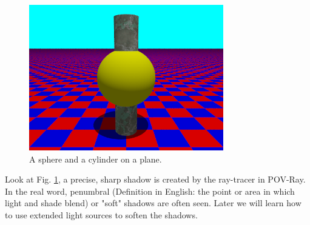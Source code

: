 \documentclass[fleqn,10pt]{wlscirep}
\newcommand*{\PV}{POV-Ray}
\newcommand*{\DF}{Definition in English}
\begin{document}
\begin{figure}[htbp]
\centering
\includegraphics[width=20pc,clip]{FIG6}
\caption{A sphere and a cylinder on a plane.}
\label{fig:FIG6}
\end{figure}

Look at Fig. \ref{fig:FIG6}, a precise, sharp shadow is created by the ray-tracer in \PV. In the real word, penumbral (\DF: the point or area in which light and shade blend) or "soft" shadows are often seen. Later we will learn how to use extended light sources to soften the shadows.
\end{document}
